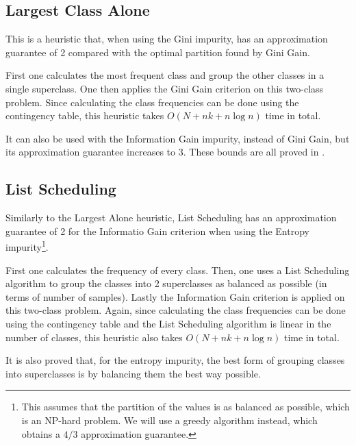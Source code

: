 \subsection{Largest Class Alone}

This is a heuristic that, when using the Gini impurity, has an approximation guarantee of 2 compared with the optimal partition found by Gini Gain.

First one calculates the most frequent class and group the other classes in a single superclass. One then applies the Gini Gain criterion on this two-class problem. Since calculating the class frequencies can be done using the contingency table, this heuristic takes $O(N + n k + n \log n)$ time in total.

It can also be used with the Information Gain impurity, instead of Gini Gain, but its approximation guarantee increases to 3. These bounds are all proved in \cite{icml2018}.

\subsection{List Scheduling}

Similarly to the Largest Alone heuristic, List Scheduling has an approximation guarantee of 2 for the Informatio Gain criterion when using the Entropy impurity\footnote{This assumes that the partition of the values is as balanced as possible, which is an NP-hard problem. We will use a greedy algorithm instead, which obtains a $4/3$ approximation guarantee.}.

First one calculates the frequency of every class. Then, one uses a List Scheduling algorithm to group the classes into 2 superclasses as balanced as possible (in terms of number of samples). Lastly the Information Gain criterion is applied on this two-class problem. Again, since calculating the class frequencies can be done using the contingency table and the List Scheduling algorithm is linear in the number of classes, this heuristic also takes $O(N + n k + n \log n)$ time in total.

It is also proved that, for the entropy impurity, the best form of grouping classes into superclasses is by balancing them the best way possible.